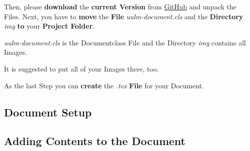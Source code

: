 \documentclass[a4paper]{../uulm-document}
\begin{document}
Then, please \textbf{download} the \textbf{current Version} from \href{https://github.com/JensOstertag/uulm-document}{GitHub} and unpack the Files. Next, you have to \textbf{move} the \textbf{File} \textit{uulm-document.cls} and the \textbf{Directory} \textit{img} \textbf{to} your \textbf{Project Folder}.

{\setlength\parindent{24pt} \color{gray}\textit{uulm-document.cls} is the Documentclass File and the Directory \textit{img} contains all Images.

It is suggested to put all of your Images there, too.}

As the last Step you can \textbf{create} the \textit{.tex} \textbf{File} for your Document.

\subsection{Document Setup}

\subsection{Adding Contents to the Document}
\end{document}
